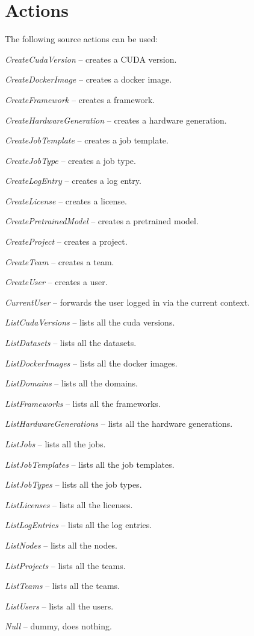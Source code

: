 \documentclass[a4paper]{book}
\begin{document}
\section{Actions}
The following source actions can be used:
\begin{tight_itemize}
  \item \textit{CreateCudaVersion} -- creates a CUDA version.
  \item \textit{CreateDockerImage} -- creates a docker image.
  \item \textit{CreateFramework} -- creates a framework.
  \item \textit{CreateHardwareGeneration} -- creates a hardware generation.
  \item \textit{CreateJobTemplate} -- creates a job template.
  \item \textit{CreateJobType} -- creates a job type.
  \item \textit{CreateLogEntry} -- creates a log entry.
  \item \textit{CreateLicense} -- creates a license.
  \item \textit{CreatePretrainedModel} -- creates a pretrained model.
  \item \textit{CreateProject} -- creates a project.
  \item \textit{CreateTeam} -- creates a team.
  \item \textit{CreateUser} -- creates a user.
  \item \textit{CurrentUser} -- forwards the user logged in via the current context.
  \item \textit{ListCudaVersions} -- lists all the cuda versions.
  \item \textit{ListDatasets} -- lists all the datasets.
  \item \textit{ListDockerImages} -- lists all the docker images.
  \item \textit{ListDomains} -- lists all the domains.
  \item \textit{ListFrameworks} -- lists all the frameworks.
  \item \textit{ListHardwareGenerations} -- lists all the hardware generations.
  \item \textit{ListJobs} -- lists all the jobs.
  \item \textit{ListJobTemplates} -- lists all the job templates.
  \item \textit{ListJobTypes} -- lists all the job types.
  \item \textit{ListLicenses} -- lists all the licenses.
  \item \textit{ListLogEntries} -- lists all the log entries.
  \item \textit{ListNodes} -- lists all the nodes.
  \item \textit{ListProjects} -- lists all the teams.
  \item \textit{ListTeams} -- lists all the teams.
  \item \textit{ListUsers} -- lists all the users.
  \item \textit{Null} -- dummy, does nothing.
\end{tight_itemize}
\end{document}
